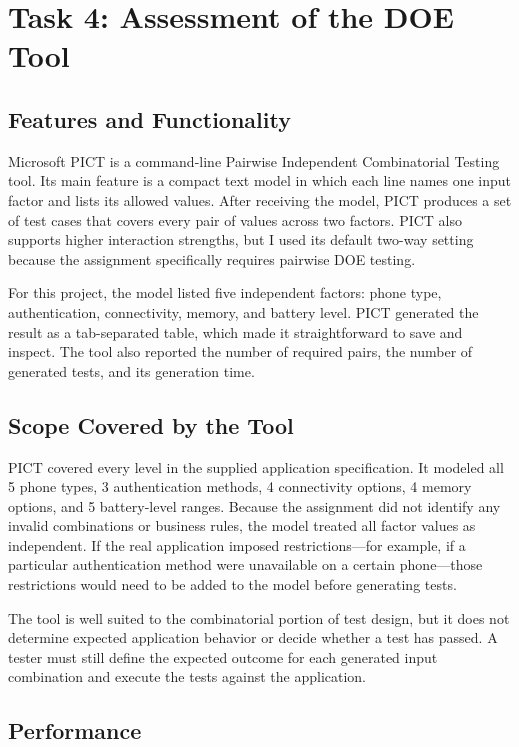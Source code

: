 \documentclass[11pt]{article}
\begin{document}
\section{Task 4: Assessment of the DOE Tool}

\subsection{Features and Functionality}

Microsoft PICT is a command-line Pairwise Independent Combinatorial Testing tool. Its main feature is a compact text model in which each line names one input factor and lists its allowed values. After receiving the model, PICT produces a set of test cases that covers every pair of values across two factors. PICT also supports higher interaction strengths, but I used its default two-way setting because the assignment specifically requires pairwise DOE testing.

For this project, the model listed five independent factors: phone type, authentication, connectivity, memory, and battery level. PICT generated the result as a tab-separated table, which made it straightforward to save and inspect. The tool also reported the number of required pairs, the number of generated tests, and its generation time.

\subsection{Scope Covered by the Tool}

PICT covered every level in the supplied application specification. It modeled all 5 phone types, 3 authentication methods, 4 connectivity options, 4 memory options, and 5 battery-level ranges. Because the assignment did not identify any invalid combinations or business rules, the model treated all factor values as independent. If the real application imposed restrictions---for example, if a particular authentication method were unavailable on a certain phone---those restrictions would need to be added to the model before generating tests.

The tool is well suited to the combinatorial portion of test design, but it does not determine expected application behavior or decide whether a test has passed. A tester must still define the expected outcome for each generated input combination and execute the tests against the application.

\subsection{Performance}
\end{document}

